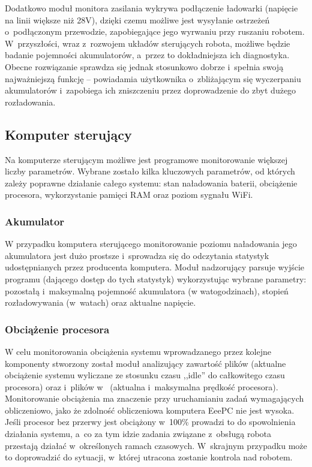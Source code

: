 Dodatkowo moduł monitora zasilania wykrywa podłączenie ładowarki (napięcie na
linii większe niż 28V), dzięki czemu możliwe jest wysyłanie ostrzeżeń 
o~podłączonym przewodzie, zapobiegające jego wyrwaniu przy ruszaniu robotem. 
W~przyszłości, wraz z~rozwojem układów sterujących robota, możliwe będzie badanie
pojemności akumulatorów, a~przez to dokładniejsza ich diagnostyka. Obecne
rozwiązanie sprawdza się jednak stosunkowo dobrze i~spełnia swoją najważniejszą
funkcję -- powiadamia użytkownika o~zbliżającym się wyczerpaniu akumulatorów 
i~zapobiega ich zniszczeniu przez doprowadzenie do zbyt dużego rozładowania.

\subsection{Komputer sterujący}

Na komputerze sterującym możliwe jest programowe monitorowanie większej liczby
parametrów. Wybrane zostało kilka kluczowych parametrów, od których zależy
poprawne działanie całego systemu: stan naładowania baterii, obciążenie
procesora, wykorzystanie pamięci RAM oraz poziom sygnału WiFi.

\subsubsection{Akumulator}

W przypadku komputera sterującego monitorowanie poziomu naładowania jego akumulatora
jest dużo prostsze i~sprowadza się do odczytania statystyk udostępnianych przez
producenta komputera. Moduł nadzorujący parsuje wyjście programu 
(dającego dostęp do tych statystyk) wykorzystując wybrane parametry: pozostałą 
i~maksymalną pojemność akumulatora (w watogodzinach), stopień rozładowywania 
(w~watach) oraz aktualne napięcie.

\subsubsection{Obciążenie procesora}

W celu monitorowania obciążenia systemu wprowadzanego przez kolejne komponenty
stworzony został moduł analizujący zawartość plików  (aktualne
obciążenie systemu wyliczane ze stosunku czasu ,,idle'' do całkowitego czasu
procesora) oraz  i~plików w~
(aktualna i~maksymalna prędkość procesora). Monitorowanie obciążenia ma
znaczenie przy uruchamianiu zadań wymagających obliczeniowo, jako że zdolność
obliczeniowa komputera EeePC nie jest wysoka. Jeśli procesor bez przerwy jest
obciążony w~100\% prowadzi to do spowolnienia działania systemu, a~co za tym
idzie zadania związane z~obsługą robota przestają działać w~określonych ramach
czasowych. W~skrajnym przypadku może to doprowadzić do sytuacji, w~której
utracona zostanie kontrola nad robotem.

